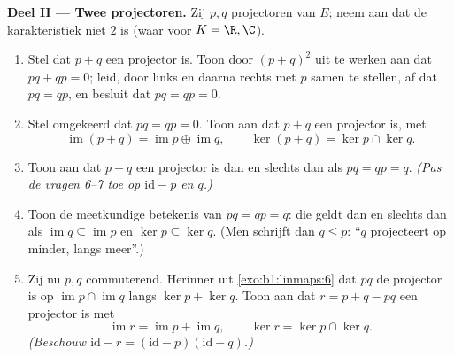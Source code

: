 \begin{problem}
\medskip
\noindent\textbf{Deel II --- Twee projectoren.} Zij $p, q$
projectoren van $E$; neem aan dat de karakteristiek niet $2$ is
(waar voor $K = \R, \C$).
\begin{enumerate}[resume]
  \item Stel dat $p + q$ een projector is. Toon door $(p + q)^2$
        uit te werken aan dat $pq + qp = 0$; leid, door links en
        daarna rechts met $p$ samen te stellen, af dat $pq = qp$,
        en besluit dat $pq = qp = 0$.
  \item Stel omgekeerd dat $pq = qp = 0$. Toon aan dat $p + q$ een
        projector is, met
        \[
        \operatorname{im}(p + q) = \operatorname{im} p \oplus
        \operatorname{im} q,
        \qquad
        \ker(p + q) = \ker p \cap \ker q .
        \]
  \item Toon aan dat $p - q$ een projector is dan en slechts dan
        als $pq = qp = q$. \emph{(Pas de vragen 6--7 toe op
        $\mathrm{id} - p$ en $q$.)}
  \item Toon de meetkundige betekenis van $pq = qp = q$: die geldt
        dan en slechts dan als $\operatorname{im} q \subseteq
        \operatorname{im} p$ en $\ker p \subseteq \ker q$. (Men
        schrijft dan $q \leq p$: ``$q$ projecteert op minder, langs
        meer''.)
  \item Zij nu $p, q$ commuterend. Herinner uit
        \cref{exo:b1:linmaps:6} dat $pq$ de projector is op
        $\operatorname{im} p \cap \operatorname{im} q$ langs $\ker
        p + \ker q$. Toon aan dat $r = p + q - pq$ een projector is
        met
        \[
        \operatorname{im} r = \operatorname{im} p +
        \operatorname{im} q,
        \qquad
        \ker r = \ker p \cap \ker q .
        \]
        \emph{(Beschouw $\mathrm{id} - r = (\mathrm{id} -
        p)(\mathrm{id} - q)$.)}
\end{enumerate}


\end{problem}
